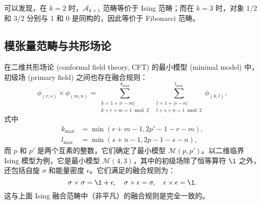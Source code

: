 可以发现，在 $k=2$ 时，$\mathcal{A}_{k+1}$ 范畴等价于 Ising 范畴；而在 $k=3$ 时，对象 {1/2 和 3/2} 分别与 1 和 0 是同构的，因此等价于 Fibonacci 范畴。

\subsection{模张量范畴与共形场论}

在二维共形场论 (conformal field theory, CFT) 的最小模型 (minimal model) 中，初级场 (primary field) 之间也存在融合规则\cite{ginsparg1988applied,francesco2012conformal}：
\begin{equation}
  \phi_{(r,s)} \times \phi_{(m,n)}
  = \sum_{\substack{k=1+|r-m| \\ k+r+m=1 \bmod 2}}^{k_{\max}} \,
    \sum_{\substack{l=1+|s-n| \\ l+s+n=1 \bmod 2}}^{l_{\max}} \phi_{(k,l)},
\end{equation}
式中
\begin{equation}
  \begin{aligned}
    k_{\max} &= \min(r+m-1, 2p'-1-r-m), \\
    l_{\max} &= \min(s+n-1, 2p-1-s-n),
  \end{aligned}
\end{equation}
而 $p$ 和 $p'$ 是两个互素的整数，它们确定了最小模型 $\mathcal{M}(p,p')$。以二维临界 Ising 模型为例，它是最小模型 $\mathcal{M}(4,3)$，其中的初级场除了恒等算符 $\1$ 之外，还包括自旋 $\sigma$ 和能量密度 $\epsilon$。它们满足的融合规则为：
\begin{equation}
  \sigma\times\sigma = \1+\epsilon, \quad
  \sigma\times\epsilon = \sigma, \quad
  \epsilon\times\epsilon = \1.
\end{equation}
这与上面 Ising 融合范畴中（非平凡）的融合规则是完全一致的。

